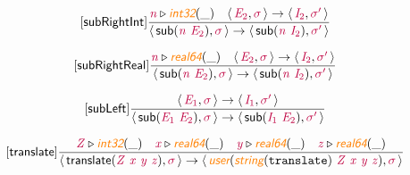 \documentclass[10pt,leqno,fleqn]{article}
\newcommand{\artVariable}[1]{\mbox{\color{purple}\em #1\/}}
\newcommand{\artConstructor}[1]{\mbox{\sf #1}}
\newcommand{\artCaseInsensitiveLiteral}[1]{\mbox{\tt #1}}
\newcommand{\artSpecial}[1]{\mbox{\color{orange}\sf\em #1}}
\begin{document}
\begin{equation}
\tag*{[\artConstructor{\sf subRightInt}]}
\begin{split}\frac{ \artVariable{n}\triangleright \artSpecial{int32}(\_) \quad \langle\, \artVariable{E$_{2}$}, \artVariable{$\sigma$}\,\rangle \rightarrow \langle\, \artVariable{I$_{2}$}, \artVariable{$\sigma$\/$^\prime$}\,\rangle }{\langle\, \artConstructor{\sf sub}(\artVariable{n}\ \artVariable{E$_{2}$}), \artVariable{$\sigma$}\,\rangle \rightarrow \langle\, \artConstructor{\sf sub}(\artVariable{n}\ \artVariable{I$_{2}$}), \artVariable{$\sigma$\/$^\prime$}\,\rangle }
\end{split}
\end{equation}

\begin{equation}
\tag*{[\artConstructor{\sf subRightReal}]}
\begin{split}\frac{ \artVariable{n}\triangleright \artSpecial{real64}(\_) \quad \langle\, \artVariable{E$_{2}$}, \artVariable{$\sigma$}\,\rangle \rightarrow \langle\, \artVariable{I$_{2}$}, \artVariable{$\sigma$\/$^\prime$}\,\rangle }{\langle\, \artConstructor{\sf sub}(\artVariable{n}\ \artVariable{E$_{2}$}), \artVariable{$\sigma$}\,\rangle \rightarrow \langle\, \artConstructor{\sf sub}(\artVariable{n}\ \artVariable{I$_{2}$}), \artVariable{$\sigma$\/$^\prime$}\,\rangle }
\end{split}
\end{equation}

\begin{equation}
\tag*{[\artConstructor{\sf subLeft}]}
\begin{split}\frac{\langle\, \artVariable{E$_{1}$}, \artVariable{$\sigma$}\,\rangle \rightarrow \langle\, \artVariable{I$_{1}$}, \artVariable{$\sigma$\/$^\prime$}\,\rangle }{\langle\, \artConstructor{\sf sub}(\artVariable{E$_{1}$}\ \artVariable{E$_{2}$}), \artVariable{$\sigma$}\,\rangle \rightarrow \langle\, \artConstructor{\sf sub}(\artVariable{I$_{1}$}\ \artVariable{E$_{2}$}), \artVariable{$\sigma$\/$^\prime$}\,\rangle }
\end{split}
\end{equation}

\begin{equation}
\tag*{[\artConstructor{\sf translate}]}
\begin{split}\frac{ \artVariable{Z}\triangleright \artSpecial{int32}(\_) \quad  \artVariable{x}\triangleright \artSpecial{real64}(\_) \quad  \artVariable{y}\triangleright \artSpecial{real64}(\_) \quad  \artVariable{z}\triangleright \artSpecial{real64}(\_) }{\langle\, \artConstructor{\sf translate}(\artVariable{Z}\ \artVariable{x}\ \artVariable{y}\ \artVariable{z}), \artVariable{$\sigma$}\,\rangle \rightarrow \langle\, \artSpecial{user}(\artSpecial{string}(\artCaseInsensitiveLiteral{translate})\ \artVariable{Z}\ \artVariable{x}\ \artVariable{y}\ \artVariable{z}), \artVariable{$\sigma$}\,\rangle }
\end{split}
\end{equation}
\end{document}
